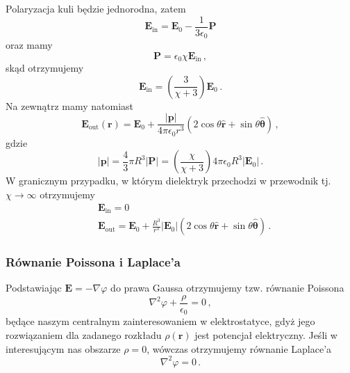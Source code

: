 \documentclass[../main.tex]{subfiles}
\begin{document}
\begin{enumerate}
\noindent Polaryzacja kuli będzie jednorodna, zatem
\begin{equation*}
    \mathbf{E}_\text{in}=\mathbf{E}_0-\frac{1}{3\epsilon_0}\mathbf{P}
\end{equation*}
oraz mamy
\begin{equation*}
    \mathbf{P}=\epsilon_0\chi\mathbf{E}_\text{in}\,,
\end{equation*}
skąd otrzymujemy
\begin{equation*}
    \mathbf{E}_\text{in}=\left(\frac{3}{\chi+3}\right)\mathbf{E}_0\,.
\end{equation*}
Na zewnątrz mamy natomiast
\begin{equation*}
    \mathbf{E}_\text{out}(\mathbf{r})=\mathbf{E}_0+\frac{|\mathbf{p}|}{4\pi\epsilon_0r^3}(2\cos\theta\mathbf{\hat{r}}+\sin\theta\boldsymbol{\hat{\theta}})\,,
\end{equation*}
gdzie
\begin{equation*}
    |\mathbf{p}|=\frac{4}{3}\pi R^3|\mathbf{P}|=\left(\frac{\chi}{\chi+3}\right)4\pi\epsilon_0R^3|\mathbf{E}_0|\,.
\end{equation*}
W granicznym przypadku, w którym dielektryk przechodzi w przewodnik tj. \(\chi\to\infty\)
otrzymujemy
\begin{equation*}
    \begin{split}
        &\mathbf{E}_\text{in}=0\\
        &\mathbf{E}_\text{out}=\mathbf{E}_0+\frac{R^3}{r^3}|\mathbf{E}_0|(2\cos\theta\mathbf{\hat{r}}+\sin\theta\boldsymbol{\hat{\theta}})\,.
    \end{split}
\end{equation*}
\end{enumerate}

\subsubsection{Równanie Poissona i Laplace'a}
Podstawiając \(\mathbf{E}=-\nabla\varphi\) do prawa Gaussa otrzymujemy tzw. równanie Poissona
\begin{equation*}
    \nabla ^2\varphi+\frac{\rho}{\epsilon_0}=0\,,
\end{equation*}
będące naszym centralnym zainteresowaniem w elektrostatyce, gdyż jego rozwiązaniem dla zadanego
rozkładu \(\rho(\mathbf{r})\) jest potencjał elektryczny. Jeśli w interesującym nas obszarze
\(\rho=0\), wówczas otrzymujemy równanie Laplace'a
\begin{equation*}
    \nabla^2\varphi=0\,.
\end{equation*}
\end{document}

